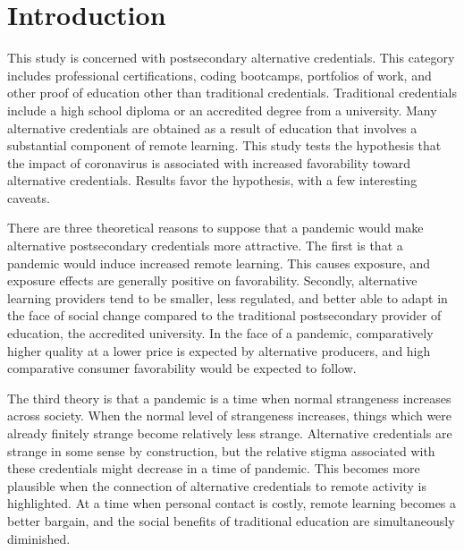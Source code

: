 \documentclass[review]{elsarticle}
\begin{document}
\pagebreak
\linenumbers

\section{Introduction}

This study is concerned with postsecondary alternative credentials.
This category includes professional certifications, coding bootcamps, portfolios of work, and other proof of education other than traditional credentials.
Traditional credentials include a high school diploma or an accredited degree from a university.
Many alternative credentials are obtained as a result of education that involves a substantial component of remote learning.
This study tests the hypothesis that the impact of coronavirus is associated with increased favorability toward alternative credentials.
Results favor the hypothesis, with a few interesting caveats.

There are three theoretical reasons to suppose that a pandemic would make alternative postsecondary credentials more attractive.
The first is that a pandemic would induce increased remote learning.
This causes exposure, and exposure effects are generally positive on favorability.
Secondly, alternative learning providers tend to be smaller, less regulated, and better able to adapt in the face of social change
compared to the traditional postsecondary provider of education, the accredited university.
In the face of a pandemic, comparatively higher quality at a lower price is expected by alternative producers,
and high comparative consumer favorability would be expected to follow.

The third theory is that a pandemic is a time when normal strangeness increases across society.
When the normal level of strangeness increases, things which were already finitely strange become relatively less strange.
Alternative credentials are strange in some sense by construction,
but the relative stigma associated with these credentials might decrease in a time of pandemic.
This becomes more plausible when the connection of alternative credentials to remote activity is highlighted.
At a time when personal contact is costly,
remote learning becomes a better bargain,
and the social benefits of traditional education are simultaneously diminished.
\end{document}
